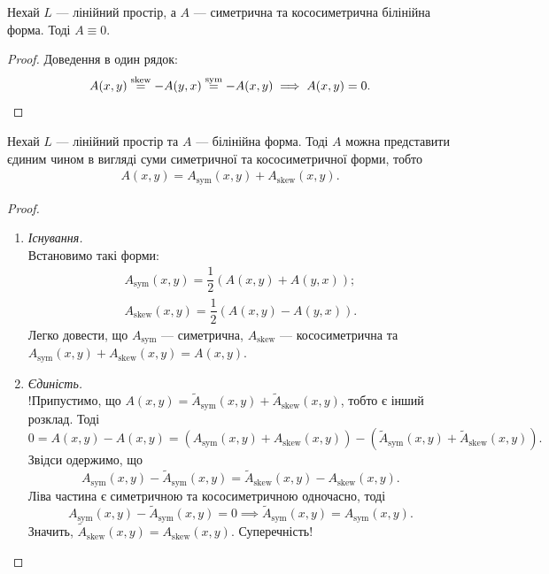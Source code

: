 \documentclass{math_library}
\begin{document}
\begin{proposition}
Нехай $L$ --- лінійний простір, а $A$ --- симетрична та кососиметрична білінійна форма. Тоді $A \equiv 0$.
\end{proposition}

\begin{proof}
Доведення в один рядок:
\[
A(x,y) \overset{\text{skew}}{=} -A(y,x) \overset{\text{sym}}{=} -A(x,y) \implies A(x,y) = 0. \qedhere
\]
\end{proof}

\begin{proposition}
Нехай $L$ --- лінійний простір та $A$ --- білінійна форма. Тоді $A$ можна представити єдиним чином в вигляді суми симетричної та кососиметричної форми, тобто
\begin{align*}
A(x,y) = A_{\text{sym}}(x,y) + A_{\text{skew}}(x,y).
\end{align*}
\end{proposition}

\begin{proof}
\begin{enumerate}[topsep=0pt,wide=0pt,label={\Roman*.)}]
\item \textit{Існування.}\\
Встановимо такі форми:
\begin{align*}
A_{\text{sym}}(x,y) = \dfrac{1}{2} \left( A(x,y) + A(y,x) \right); \\
A_{\text{skew}}(x,y) = \dfrac{1}{2} \left( A(x,y) - A(y,x) \right).
\end{align*}
Легко довести, що $A_{\text{sym}}$ --- симетрична, $A_{\text{skew}}$ --- кососиметрична та $A_{\text{sym}}(x,y) + A_{\text{skew}}(x,y) = A(x,y)$.

\item \textit{Єдиність.}\\
!Припустимо, що $A(x,y) = \widetilde{A}_{\text{sym}}(x,y) + \widetilde{A}_{\text{skew}}(x,y)$, тобто є інший розклад. Тоді
\[
0 = A(x,y) - A(x,y) = (A_{\text{sym}}(x,y) + A_{\text{skew}}(x,y)) - (\widetilde{A}_{\text{sym}}(x,y) + \widetilde{A}_{\text{skew}}(x,y)).
\]
Звідси одержимо, що
\[
A_{\text{sym}}(x,y) - \widetilde{A}_{\text{sym}}(x,y) = \widetilde{A}_{\text{skew}}(x,y) - A_{\text{skew}}(x,y).
\]
Ліва частина є симетричною та кососиметричною одночасно, тоді 
\[
A_{\text{sym}}(x,y) - \widetilde{A}_{\text{sym}}(x,y) = 0 \implies \widetilde{A}_{\text{sym}}(x,y) = A_{\text{sym}}(x,y).
\]
Значить, $\widetilde{A}_{\text{skew}}(x,y) = A_{\text{skew}}(x,y)$. Суперечність! \qedhere
\end{enumerate}
\end{proof}
\noindent
\end{document}
